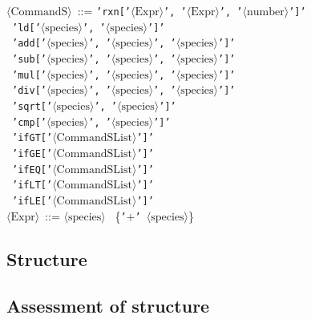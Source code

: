 \begin{tabbing}
    $\langle \text{CommandS} \rangle$ \,::=\;  \texttt{'rxn['$\langle \text{Expr} \rangle$', '$\langle \text{Expr} \rangle$', '$\langle \text{number} \rangle$']'} \\
    \>\textbar \, \texttt{'ld['$\langle \text{species} \rangle$', '$\langle \text{species} \rangle$']'} \\
    \>\textbar \, \texttt{'add['$\langle \text{species} \rangle$', '$\langle \text{species} \rangle$', '$\langle \text{species} \rangle$']'} \\
    \>\textbar \, \texttt{'sub['$\langle \text{species} \rangle$', '$\langle \text{species} \rangle$', '$\langle \text{species} \rangle$']'} \\
    \>\textbar \, \texttt{'mul['$\langle \text{species} \rangle$', '$\langle \text{species} \rangle$', '$\langle \text{species} \rangle$']'} \\
    \>\textbar \, \texttt{'div['$\langle \text{species} \rangle$', '$\langle \text{species} \rangle$', '$\langle \text{species} \rangle$']'} \\
    \>\textbar \, \texttt{'sqrt['$\langle \text{species} \rangle$', '$\langle \text{species} \rangle$']'} \\
    \>\textbar \, \texttt{'cmp['$\langle \text{species} \rangle$', '$\langle \text{species} \rangle$']'} \\
    \>\textbar \, \texttt{'ifGT['$\langle \text{CommandSList} \rangle$']'} \\
    \>\textbar \, \texttt{'ifGE['$\langle \text{CommandSList} \rangle$']'} \\
    \>\textbar \, \texttt{'ifEQ['$\langle \text{CommandSList} \rangle$']'} \\
    \>\textbar \, \texttt{'ifLT['$\langle \text{CommandSList} \rangle$']'} \\
    \>\textbar \, \texttt{'ifLE['$\langle \text{CommandSList} \rangle$']'} \\
     
    $\langle \text{Expr} \rangle$ \,::=\;  \texttt{$\langle \text{species} \rangle$} \, \{\texttt{'$+$' $\langle \text{species} \rangle$}\}
\end{tabbing}

\subsection{Structure}

\subsection{Assessment of structure}





